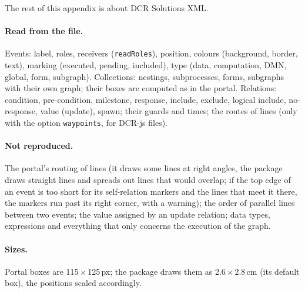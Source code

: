 \documentclass[a4paper,11pt]{article}
\newcommand\key[1]{\texttt{#1}}
\begin{document}
The rest of this appendix is about DCR Solutions XML.

\paragraph{Read from the file.} Events: label, roles, receivers
(\texttt{readRoles}), position, colours
(background, border, text), marking (executed, pending, included), type
(data, computation, DMN, global, form, subgraph). Collections: nestings,
subprocesses, forms, subgraphs with their own graph; their boxes are
computed as in the portal. Relations: condition, pre-condition, milestone,
response, include, exclude, logical include, no-response, value (update),
spawn; their guards and times; the routes of lines (only with the option
\key{waypoints}, for DCR-js files).

\paragraph{Not reproduced.} The portal's routing of lines (it draws some
lines at right angles, the package draws straight lines and spreads out
lines that would overlap; if the top edge of an event is too short for its
self-relation markers and the lines that meet it there, the markers run
past its right corner, with a warning); the order of parallel lines between two events;
the value assigned by an update relation; data types, expressions and
everything that only concerns the execution of the graph.

\paragraph{Sizes.} Portal boxes are 115\,$\times$\,125\,px; the package draws
them as 2.6\,$\times$\,2.8\,cm (its default box), the positions scaled
accordingly.
\end{document}
